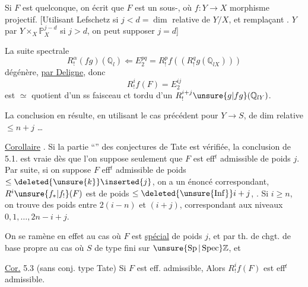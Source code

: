 

Si $F$ est quelconque, on écrit que $F$ est un sous-, où $f:Y\longrightarrow X$ morphisme projectif. [Utilisant Lefschetz    si $j<d=\dim$ relative de $Y/X$, et remplaçant . $Y$ par $Y\times_X\mathbb P_X^{j-d}$ si $j>d$, on peut supposer $j=d$]


La suite spectrale
\[
R^\alpha_!(fg)(\mathbb Q_l)\Longleftarrow E^{pq}_2=R^p_!f((R^q_!g(\mathbb Q_{lX})))
\]
dégénère, \uline{par Deligne}, donc
\[
R^i_!f(F)=E^{ij}_2
\]
est $\simeq$ quotient  d'un ss faisceau ct tordu d'un $R^{i+j}_!\unsure{g|fg}(\mathbb Q_{lY})$.

\margin{[N.B. Voir si Deligne ne peut se remplacer par \uline{\unsure{factorisation} de Artin} sur $X\longrightarrow S$, \unsure{puis} ramener au cas de $n=1$\ldots]}

La conclusion en résulte, en utilisant le cas précédent pour $Y\longrightarrow S$, de dim relative $\leq n+j$ \ldots

\uline{Corollaire} . Si la partie ``'' des conjectures de Tate est vérifiée, la conclusion de 5.1. est vraie dès que l'on suppose seulement que $F$ est eff$^{t}$ admissible de poids $j$. Par suite, si on suppose $F$ eff$^{t}$ admissible de poids $\leq\deleted{\unsure{k}}\inserted{j}$, on a un énoncé correspondant,  $R^i\unsure{f_*|f_!}(F)$ est  de poids $\leq\deleted{\unsure{\operatorname{Inf}}}i+j$,  . Si $i\geq n$, on trouve des poids entre $2(i-n)$ et $(i+j)$, correspondant aux niveaux $0,1,\ldots,2n-i+j$.

On se ramène en effet  au cas où $F$ est \uline{spécial} de poids $j$, et par th. de chgt. de base propre au cas où $S$ de type fini sur $\unsure{\operatorname{Sp}|\operatorname{Spec}}\mathbb Z$, et


\uline{Cor.} 5.3 (sans conj. type Tate)  Si $F$ est eff. admissible, Alors $R^i_!f(F)$ est eff$^{t}$ admissible.
